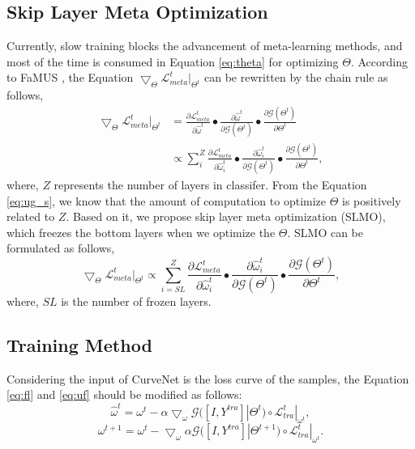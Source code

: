 \documentclass[letterpaper]{article} %
\begin{document}
\subsection{Skip Layer Meta Optimization}
Currently, slow training blocks the advancement of meta-learning methods, and most of the time is consumed in Equation \ref{eq:theta} for optimizing $\Theta$.
According to FaMUS \cite{Xu2021FaMUS}, the Equation $\bigtriangledown_\Theta \mathcal{L}^{t}_{meta}|_{\Theta^{t}}$ can be rewritten by the chain rule as follows,
\begin{equation}
\begin{split}
     \bigtriangledown_\Theta \mathcal{L}^{t}_{meta}|_{\Theta^{t}}  & = \frac{\partial \mathcal{L}^{t}_{meta} }{\partial \hat{\omega}^t} \bullet \frac{\partial \hat{\omega}^t}{\partial \mathcal{G}(\Theta^{t})} \bullet \frac{\partial \mathcal{G}(\Theta^{t})}{\partial \Theta^{t}} \\
     & \varpropto \sum_i^Z \frac{\partial \mathcal{L}^{t}_{meta} }{\partial \hat{\omega}^t_i} \bullet \frac{\partial \hat{\omega}^t_i}{\partial \mathcal{G}(\Theta^{t})} \bullet \frac{\partial \mathcal{G}(\Theta^{t})}{\partial \Theta^{t}},
\end{split}
    \label{eq:ug_s}
\end{equation}
where, $Z$ represents the number of layers in classifer.
From the Equation \ref{eq:ug_s}, we know that the amount of computation to optimize $\Theta$ is positively related to $Z$.
Based on it, we propose skip layer meta optimization (SLMO), which freezes the bottom layers when we optimize the $\Theta$.
SLMO can be formulated as follows,
\begin{equation}
     \bigtriangledown_\Theta \mathcal{L}^{t}_{meta}|_{\Theta^{t}}   \varpropto \sum_{i=SL}^Z \frac{\partial \mathcal{L}^{t}_{meta} }{\partial \hat{\omega}^t_i} \bullet \frac{\partial \hat{\omega}^t_i}{\partial \mathcal{G}(\Theta^{t})} \bullet \frac{\partial \mathcal{G}(\Theta^{t})}{\partial \Theta^{t}},
    \label{eq:ug_sK}
\end{equation}
where, $SL$ is the number of frozen layers.

\subsection{Training Method}

Considering the input of CurveNet is the loss curve of the samples, the Equation \ref{eq:fl} and \ref{eq:uf} should be modified as follows:
\begin{equation}
    \hat{\omega}^{t} = \omega^{t} - \alpha \bigtriangledown_\omega \mathcal{G}([I, Y^{tra}]|\Theta^{t}) \circ \mathcal{L}^{t}_{tra}|_{\omega^{t}},
    \label{eq:fl_our}
\end{equation}
\begin{equation}
    \omega^{t+1} = \omega^{t} - \bigtriangledown_\omega \alpha \mathcal{G}([I, Y^{tra}]|\Theta^{t+1}) \circ \mathcal{L}^{t}_{tra}|_{\omega^{t}}.
    \label{eq:uf_our}
\end{equation}
\end{document}
